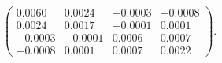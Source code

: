 \documentclass[11pt, oneside]{article}   	%
\begin{document}
\begin{equation*}
\begin{pmatrix}
0.0060 & 0.0024 & -0.0003 & -0.0008 \\
0.0024 & 0.0017 & -0.0001 & 0.0001 \\
-0.0003 & -0.0001 & 0.0006 & 0.0007 \\
-0.0008 & 0.0001 & 0.0007 & 0.0022
  \end{pmatrix}.
 \end{equation*}
%
%
%
\end{document}
